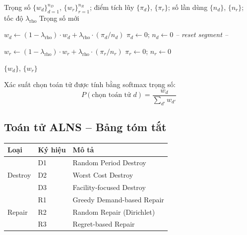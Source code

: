 \documentclass[12pt]{article}
\begin{document}
\begin{algorithm}[H]
\caption{Cập nhật trọng số thích nghi ALNS}
\label{alg:weight_update}
\begin{algorithmic}[1]
\Require Trọng số $\{w_d\}_{d=1}^{n_D}$, $\{w_r\}_{r=1}^{n_R}$; điểm tích lũy $\{\pi_d\}$, $\{\pi_r\}$; số lần dùng $\{n_d\}$, $\{n_r\}$; tốc độ $\lambda_{\text{rho}}$
\Ensure Trọng số mới

    \State $w_d \gets (1-\lambda_{\text{rho}}) \cdot w_d + \lambda_{\text{rho}} \cdot (\pi_d / n_d)$
  \EndIf
  \State $\pi_d \gets 0$; \; $n_d \gets 0$ \quad \textit{-- reset segment --}
\EndFor

    \State $w_r \gets (1-\lambda_{\text{rho}}) \cdot w_r + \lambda_{\text{rho}} \cdot (\pi_r / n_r)$
  \EndIf
  \State $\pi_r \gets 0$; \; $n_r \gets 0$
\EndFor

\State \Return $\{w_d\}$, $\{w_r\}$

\end{algorithmic}
\end{algorithm}

\noindent Xác suất chọn toán tử được tính bằng softmax trọng số:
\begin{equation}
  P(\text{chọn toán tử } d) = \frac{w_d}{\sum_{d'} w_{d'}}
\end{equation}

\subsection{Toán tử ALNS -- Bảng tóm tắt}

\begin{center}
\begin{tabular}{lll}
\toprule
\textbf{Loại} & \textbf{Ký hiệu} & \textbf{Mô tả} \\
\midrule
\multirow{3}{*}{Destroy} & D1 & Random Period Destroy \\
                          & D2 & Worst Cost Destroy \\
                          & D3 & Facility-focused Destroy \\
\midrule
\multirow{3}{*}{Repair}  & R1 & Greedy Demand-based Repair \\
                          & R2 & Random Repair (Dirichlet) \\
                          & R3 & Regret-based Repair \\
\bottomrule
\end{tabular}
\end{center}
\end{document}

